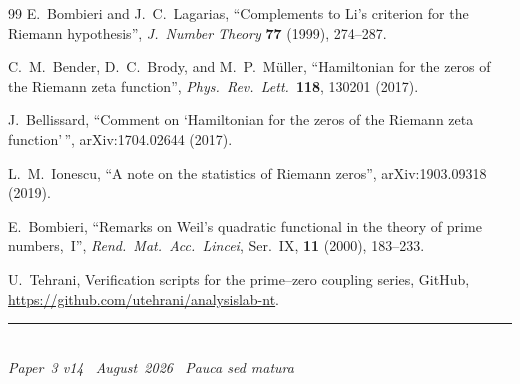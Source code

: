 \documentclass[11pt]{article}
\begin{document}
\begin{thebibliography}{99}
E.~Bombieri and J.~C.~Lagarias,
``Complements to Li's criterion for the Riemann hypothesis'',
\textit{J.\ Number Theory} \textbf{77} (1999), 274--287.

C.~M.~Bender, D.~C.~Brody, and M.~P.~M\"uller,
``Hamiltonian for the zeros of the Riemann zeta function'',
\textit{Phys.\ Rev.\ Lett.}\ \textbf{118}, 130201 (2017).

J.~Bellissard,
``Comment on `Hamiltonian for the zeros of the Riemann zeta function'\,'',
arXiv:1704.02644 (2017).

L.~M.~Ionescu,
``A note on the statistics of Riemann zeros'',
arXiv:1903.09318 (2019).

E.~Bombieri,
``Remarks on Weil's quadratic functional in the theory of prime
numbers,~I'',
\textit{Rend.\ Mat.\ Acc.\ Lincei}, Ser.~IX,
\textbf{11} (2000), 183--233.

U.~Tehrani,
Verification scripts for the prime--zero coupling series,
GitHub, \url{https://github.com/utehrani/analysislab-nt}.

\end{thebibliography}


\enlargethispage{3\baselineskip}
\vspace*{\fill}
\begin{minipage}{\linewidth}
\rule{\linewidth}{0.4pt}\smallskip\\
\small\emph{Paper~3 v14 \textperiodcentered\ August~2026
\textperiodcentered\ Pauca sed matura}
\end{minipage}
\end{document}
